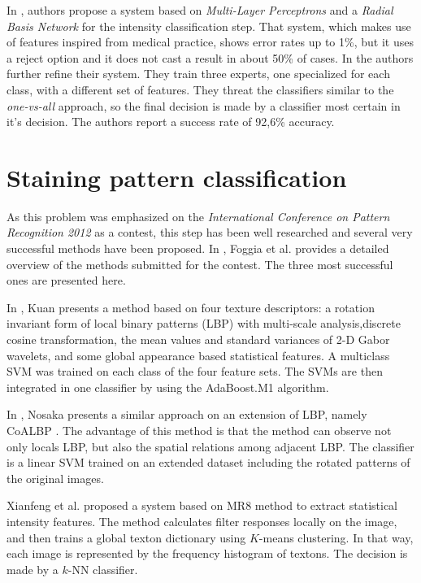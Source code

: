 In \cite{SodaIntensity2006},  authors propose a system based on  \textit{Multi-Layer Perceptrons} and a \textit{Radial Basis Network} for the intensity classification step. That system, which makes use of features inspired from medical practice, shows error rates  up to 1\%, but it uses a reject option and it does not cast a result in about 50\% of cases. In \cite{SodaIntensity2009} the authors further refine their system. They train three experts, one specialized for each class, with a different set of features. They threat the classifiers similar to the \textit{one-vs-all} approach, so the final decision is made by a classifier most certain in it's decision. The authors report a success rate of 92,6\% accuracy.



\section{Staining pattern classification}

As this problem was emphasized on the \textit{International Conference on Pattern Recognition 2012} as a contest, this step has been well researched and several very successful methods have been proposed. In \cite{FoggiaBenchmarks2013}, Foggia et al. provides a detailed overview of the methods submitted for the contest. The three most successful ones are presented here. 

In \cite{Kuan2012}, Kuan presents a method based on four texture descriptors: a rotation invariant form of local binary patterns (LBP) with multi-scale analysis,discrete cosine transformation, the mean values and standard variances of 2-D Gabor wavelets, and some global appearance based statistical features. A multiclass SVM was trained on each class of the four feature sets. The SVMs are then integrated in one classifier by using the AdaBoost.M1 algorithm.

In \cite{Nosaka2012}, Nosaka presents a similar approach on an extension of LBP, namely CoALBP \cite{Nosaka2011}. The advantage of this method is that the method can observe not only locals LBP, but also the spatial relations among adjacent LBP. The classifier is a linear SVM trained on an extended dataset including the rotated patterns of the original images. 

Xianfeng et al. proposed a system based on MR8 method \cite{Varma2005} to extract statistical intensity features. The method calculates filter responses locally on the image, and then trains a global texton dictionary using $K$-means clustering. In that way, each image is represented by the frequency histogram of textons. The decision is made by a $k$-NN classifier.

